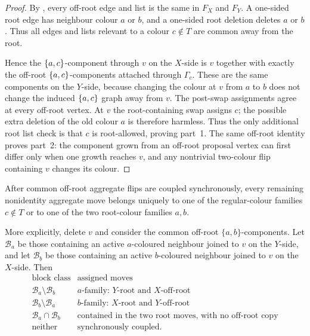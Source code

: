 \begin{proof}
By , every off-root edge and list
is the same in $F_X$ and $F_Y$.  A one-sided root edge has neighbour
colour $a$ or $b$, and a one-sided root deletion deletes $a$ or $b$.
Thus all edges and lists relevant to a colour $c\notin T$ are common away
from the root.

Hence the $\left\{a,c\right\}$-component through $v$ on the
$X$-side is $v$ together with exactly the off-root
$\left\{a,c\right\}$-components attached through $\Gamma_c$. These are the same
components on the $Y$-side, because changing the colour at $v$
from $a$ to $b$ does not change the induced $\left\{a,c\right\}$ graph away from
$v$. The post-swap assignments agree at every off-root vertex. At $v$ the
root-containing swap assigns $c$; the possible extra deletion of the old
colour $a$ is therefore harmless. Thus the only additional root list check
is that $c$ is root-allowed, proving part~1. The same off-root identity
proves part~2: the component grown from an off-root proposal vertex can first differ
only when one growth reaches $v$, and any nontrivial two-colour flip
containing $v$ changes its colour.
\end{proof}

\begin{lemma}\label{lem:cv-move-partition}
After common off-root aggregate flips are coupled synchronously, every
remaining nonidentity aggregate move belongs
uniquely to one of the regular-colour families \(c\notin T\) or to one of
the two root-colour families \(a,b\).

More explicitly, delete \(v\) and consider the common off-root
\(\{a,b\}\)-components.  Let \(\mathcal B_a\) be those containing an
active \(a\)-coloured neighbour joined to \(v\) on the \(Y\)-side, and let
\(\mathcal B_b\) be those containing an active \(b\)-coloured neighbour
joined to \(v\) on the \(X\)-side.  Then
\[
\begin{array}{c|c}
\text{block class}&\text{assigned moves}\\ \hline
\mathcal B_a\setminus\mathcal B_b&
  \text{\(a\)-family: \(Y\)-root and \(X\)-off-root}\\
\mathcal B_b\setminus\mathcal B_a&
  \text{\(b\)-family: \(X\)-root and \(Y\)-off-root}\\
\mathcal B_a\cap\mathcal B_b&
  \text{contained in the two root moves, with no off-root copy}\\
\text{neither}&\text{synchronously coupled}.
\end{array}
\]
\end{lemma}

